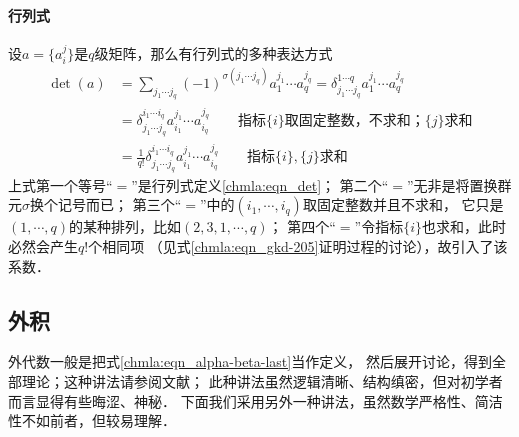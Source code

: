 \paragraph{行列式}
设$a=\{a_i^j\}$是$q$级矩阵，那么有行列式的多种表达方式
\begin{equation}\label{chmla:eqn_gkd-305}
\begin{aligned}
    \det (a) &= \sum_{j_1 \cdots j_q} (-1)^{\sigma(j_1  \cdots j_q)}
    a_{1}^{j_1} \cdots a_{q}^{j_q}
    = \delta_{j_1 \cdots j_q}^{1 \cdots q}  a^{j_1}_{1} \cdots a^{j_q}_{q} \\
    &= \delta_{j_1 \cdots j_q}^{i_1 \cdots i_q}  a^{j_1}_{i_1} \cdots a^{j_q}_{i_q}
       \qquad \text{指标$\{i\}$取固定整数，不求和；$\{j\}$求和} \\
    &= \frac{1}{q!} \delta_{j_1 \cdots j_q}^{i_1 \cdots i_q} a_{i_1}^{j_1} \cdots a_{i_q}^{j_q}
       \qquad \text{指标$\{i\},\{j\}$求和}
\end{aligned}
\end{equation}  %
上式第一个等号“$=$”是行列式定义\eqref{chmla:eqn_det}； 
第二个“$=$”无非是将置换群元$\sigma$换个记号而已；
第三个“$=$”中的$(i_1,\cdots,i_q)$取固定整数并且不求和，
它只是$(1,\cdots,q)$的某种排列，比如$(2,3,1,\cdots,q)$；
第四个“$=$”令指标$\{i\}$也求和，此时必然会产生$q!$个相同项
（见式\eqref{chmla:eqn_gkd-205}证明过程的讨论），故引入了该系数．




\subsection{外积}\label{chmla:sec_exterior-product}
外代数一般是把式\eqref{chmla:eqn_alpha-beta-last}当作定义，
然后展开讨论，得到全部理论；这种讲法请参阅文献\parencite[\S 2.3]{cc2001-zh}；
此种讲法虽然逻辑清晰、结构缜密，但对初学者而言显得有些晦涩、神秘．
下面我们采用另外一种讲法，虽然数学严格性、简洁性不如前者，但较易理解．

